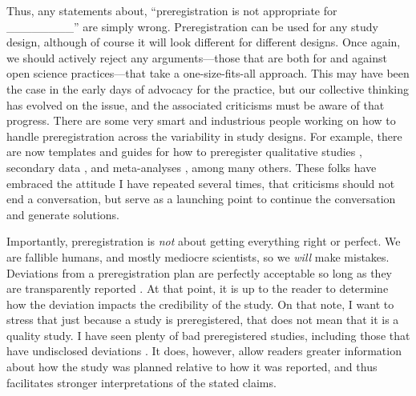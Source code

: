 \documentclass[authordate, empirical]{jote-new-article}
\begin{document}







Thus, any statements about, “preregistration is not appropriate for \_\_\_\_\_\_\_\_” are simply wrong. Preregistration can be used for any study design, although of course it will look different for different designs. Once again, we should actively reject any arguments—those that are both for and against open science practices—that take a one-size-fits-all approach. This may have been the case in the early days of advocacy for the practice, but our collective thinking has evolved on the issue, and the associated criticisms must be aware of that progress. There are some very smart and industrious people working on how to handle preregistration across the variability in study designs. For example, there are now templates and guides for how to preregister qualitative studies \parencites{Haven2019}, secondary data \parencites{Weston2019}, and meta-analyses \parencites{Moreau2022}, among many others. These folks have embraced the attitude I have repeated several times, that criticisms should not end a conversation, but serve as a launching point to continue the conversation and generate solutions.







Importantly, preregistration is \emph{not} about getting everything right or perfect. We are fallible humans, and mostly mediocre scientists, so we \emph{will} make mistakes. Deviations from a preregistration plan are perfectly acceptable so long as they are transparently reported \parencites{Willroth2023}. At that point, it is up to the reader to determine how the deviation impacts the credibility of the study. On that note, I want to stress that just because a study is preregistered, that does not mean that it is a quality study. I have seen plenty of bad preregistered studies, including those that have undisclosed deviations \parencites[see][]{Claesen2021}. It does, however, allow readers greater information about how the study was planned relative to how it was reported, and thus facilitates stronger interpretations of the stated claims.
\end{document}
